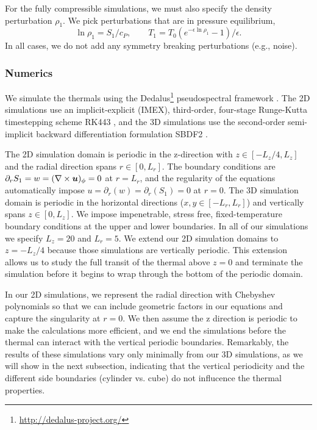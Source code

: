 For the fully compressible simulations, we must also specify the density perturbation $\rho_1$.
We pick perturbations that are in pressure equilibrium,
\begin{equation}
\ln\rho_1 = S_1/c_P, \qquad T_1 = T_0(e^{-\epsilon\ln\rho_1} - 1)/\epsilon.
\end{equation}
In all cases, we do not add any symmetry breaking perturbations (e.g., noise).


\subsubsection{Numerics}
We simulate the thermals using the  Dedalus\footnote{\url{http://dedalus-project.org/}} pseudospectral framework \citep{burns&all2016, burns&all2019}.
The 2D simulations use an implicit-explicit (IMEX), third-order, four-stage Runge-Kutta timestepping scheme RK443 \citep{ascher&all1997}, and the 3D simulations use the second-order semi-implicit backward differentiation formulation SBDF2 \citep{wang&ruuth2008}.

The 2D simulation domain is periodic in the z-direction with $z \in [-L_z/4, L_z]$ and the radial direction spans $r \in [0, L_r]$.
The boundary conditions are $\partial_r S_1 = w = (\nabla\times\bm{u})_\phi = 0$ at $r = L_r$, and the regularity of the equations automatically impose $u = \partial_r(w) = \partial_r(S_1) = 0$ at $r = 0$.
The 3D simulation domain is periodic in the horizontal directions ($x, y \in [-L_r, L_r]$) and vertically spans $z \in [0, L_z]$.
We impose impenetrable, stress free, fixed-temperature boundary conditions at the upper and lower boundaries.
In all of our simulations we specify $L_z = 20$ and $L_r = 5$.
We extend our 2D simulation domains to $z = -L_z/4$ because those simulations are vertically periodic.
This extension allows us to study the full transit of the thermal above $z = 0$ and terminate the simulation before it begins to wrap through the bottom of the periodic domain.

In our 2D simulations, we represent the radial direction with Chebyshev polynomials so that we can include geometric factors in our equations and capture the singularity at $r = 0$.
We then assume the z direction is periodic to make the calculations more efficient, and we end the simulations before the thermal can interact with the vertical periodic boundaries.
Remarkably, the results of these simulations vary only minimally from our 3D simulations, as we will show in the next subsection, indicating that the vertical periodicity and the different side boundaries (cylinder vs. cube) do not influcence the thermal properties.

